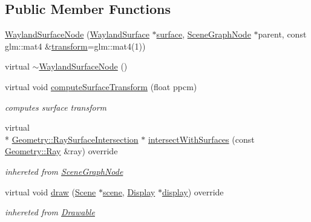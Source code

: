 \subsection*{Public Member Functions}
\begin{DoxyCompactItemize}
\item 
\hyperlink{classmotorcar_1_1WaylandSurfaceNode_ad7d045ae80caac6164e293ba5c7e9307}{Wayland\-Surface\-Node} (\hyperlink{classmotorcar_1_1WaylandSurface}{Wayland\-Surface} $\ast$\hyperlink{simple-egl_8cpp_a0720952aa1caded45b5bcdce589663a9}{surface}, \hyperlink{classmotorcar_1_1SceneGraphNode}{Scene\-Graph\-Node} $\ast$parent, const glm\-::mat4 \&\hyperlink{classmotorcar_1_1SceneGraphNode_ad96e79fdd739ac8223a3128003be391a}{transform}=glm\-::mat4(1))
\item 
virtual \hyperlink{classmotorcar_1_1WaylandSurfaceNode_aa5b4593dd0f4834a4d8e1416f322ac8f}{$\sim$\-Wayland\-Surface\-Node} ()
\item 
virtual void \hyperlink{classmotorcar_1_1WaylandSurfaceNode_a0dfac06ca2855e41613b6e663c76c97e}{compute\-Surface\-Transform} (float ppcm)
\begin{DoxyCompactList}\small\item\em computes surface transform \end{DoxyCompactList}\item 
virtual \\*
\hyperlink{structmotorcar_1_1Geometry_1_1RaySurfaceIntersection}{Geometry\-::\-Ray\-Surface\-Intersection} $\ast$ \hyperlink{classmotorcar_1_1WaylandSurfaceNode_adf71a714d07bb262405a361504a77ea4}{intersect\-With\-Surfaces} (const \hyperlink{structmotorcar_1_1Geometry_1_1Ray}{Geometry\-::\-Ray} \&ray) override
\begin{DoxyCompactList}\small\item\em inhereted from \hyperlink{classmotorcar_1_1SceneGraphNode}{Scene\-Graph\-Node} \end{DoxyCompactList}\item 
virtual void \hyperlink{classmotorcar_1_1WaylandSurfaceNode_a1afe3178777574dd1b3c66d7d19d871b}{draw} (\hyperlink{classmotorcar_1_1Scene}{Scene} $\ast$\hyperlink{classmotorcar_1_1SceneGraphNode_aa14e637ed4ae98f77e28941a4b5cfdd8}{scene}, \hyperlink{classmotorcar_1_1Display}{Display} $\ast$\hyperlink{structdisplay}{display}) override
\begin{DoxyCompactList}\small\item\em inhereted from \hyperlink{classmotorcar_1_1Drawable}{Drawable} \end{DoxyCompactList}\item 

\end{DoxyCompactItemize}

